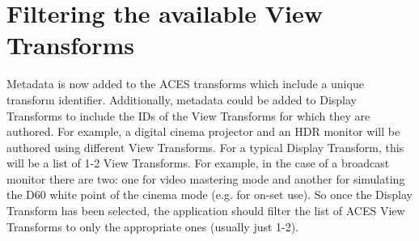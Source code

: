 \numberedformat
\chapter{Filtering the available View Transforms}

Metadata is now added to the ACES transforms which include a unique transform identifier. Additionally, metadata could be added to Display Transforms to include the IDs of the View Transforms for which they are authored. For example, a digital cinema projector and an HDR monitor will be authored using different View Transforms. For a typical Display Transform, this will be a list of 1-2 View Transforms. For example, in the case of a broadcast monitor there are two: one for video mastering mode and another for simulating the D60 white point of the cinema mode (e.g. for on-set use). So once the Display Transform has been selected, the application should filter the list of ACES View Transforms to only the appropriate ones (usually just 1-2).